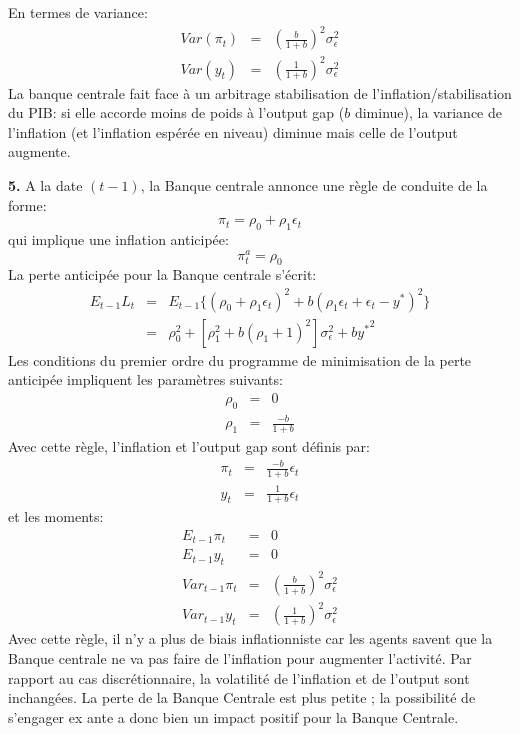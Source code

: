 \documentclass[11pt,a4paper]{article}
\begin{document}
\noindent En termes de variance: 
\begin{eqnarray*}
Var(\pi_t)&=&\left(\frac{b}{1+b}\right)^2 \sigma_\epsilon^2 \\
Var(y_t)&=&\left(\frac{1}{1+b}\right)^2 \sigma_\epsilon^2
\end{eqnarray*}
La banque centrale fait face \`a un arbitrage stabilisation de
l'inflation/stabilisation du PIB: si elle accorde moins de poids \`a
l'output gap ($b$ diminue), la variance de l'inflation (et l'inflation
esp\'er\'ee en niveau) diminue mais celle de l'output augmente.

\smallskip \noindent \textbf{5.} A la date $(t-1)$, la Banque centrale
annonce une r\`egle de conduite de la forme: 
\begin{equation*}
\pi_t=\rho_0+\rho_1 \epsilon_t
\end{equation*}
qui implique une inflation anticip\'ee:%
\begin{equation*}
\pi_t^a=\rho_0
\end{equation*}
La perte anticip\'ee pour la Banque centrale s'\'ecrit: 
\begin{eqnarray*}
E_{t-1}L_t&=&E_{t-1}\{(\rho_0+\rho_1\epsilon_t)^2+b(\rho_1\epsilon_t+%
\epsilon_t-y^\ast)^2\} \\
&=&\rho_0^2+[\rho_1^2+b(\rho_1+1)^2]\sigma_\epsilon^2+b\left.y^\ast\right.^2
\end{eqnarray*}
Les conditions du premier ordre du programme de minimisation de la perte
anticip\'ee impliquent les param\`etres suivants: 
\begin{eqnarray*}
\rho_0&=&0 \\
\rho_1&=&\frac{-b}{1+b}
\end{eqnarray*}
Avec cette r\`egle, l'inflation et l'output gap sont d\'efinis par: 
\begin{eqnarray*}
\pi_t&=&\frac{-b}{1+b}\epsilon_t \\
y_t&=&\frac{1}{1+b}\epsilon_t
\end{eqnarray*}
et les moments: 
\begin{eqnarray*}
E_{t-1}\pi_t&=&0 \\
E_{t-1}y_t&=&0 \\
Var_{t-1}\pi_t&=&\left(\frac{b}{1+b}\right)^2\sigma_\epsilon^2 \\
Var_{t-1}y_t&=&\left(\frac{1}{1+b}\right)^2\sigma_\epsilon^2
\end{eqnarray*}
Avec cette r\`egle, il n'y a plus de biais inflationniste car les agents
savent que la Banque centrale ne va pas faire de l'inflation pour augmenter
l'activit\'e. Par rapport au cas discr\'etionnaire, la volatilit\'e de
l'inflation et de l'output sont inchang\'ees. La perte de la Banque Centrale
est plus petite ; la possibilit\'e de s'engager ex ante a donc bien un
impact positif pour la Banque Centrale.
\end{document}
